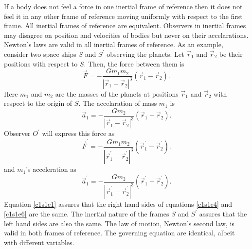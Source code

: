 If a body does not feel a force in one inertial frame of reference then it
does not feel it in any other frame of reference moving uniformly with respect
to the first frame. All inertial frames of reference are equivalent. Observers
in inertial frames may disagree on position and velocities of bodies but never
on their accelarations. Newton's laws are valid in all inertial frames of 
reference. As an example, consider two space ships $S$ and $S^\prime$ observing
the planets. Let $\vec{r}_1$ and $\vec{r}_2$ be their positions with respect
to $S$. Then, the force between them is
\begin{equation}\label{c1s1e4}
\vec{F} = -\frac{Gm_1m_2}{|\vec{r}_1 - \vec{r}_2|^3}(\vec{r}_1 - \vec{r}_2).
\end{equation}
Here $m_1$ and $m_2$ are the masses of the planets at positions $\vec{r}_1$
and $\vec{r}_2$ with respect to the origin of $S$. The accelaration of mass 
$m_1$ is
\begin{equation}\label{c1s1e5}
\vec{a}_1 = -\frac{Gm_2} {|\vec{r}_1 - \vec{r}_2|^3}(\vec{r}_1 - \vec{r}_2).
\end{equation}
Observer $O^\prime$ will express this force as
\begin{equation}\label{c1s1e6}
\vec{F}^\prime = 
-\frac{Gm_1m_2}{|\vec{r}_1^\prime - \vec{r}_2^\prime|^3}
(\vec{r}_1^\prime - \vec{r}_2^\prime).
\end{equation}
and $m_1$'s acceleration as 
\begin{equation}\label{c1s1e7}
\vec{a}_1^\prime = -\frac{Gm_2} {|\vec{r}_1^\prime - \vec{r}_2^\prime|^3}
(\vec{r}_1^\prime - \vec{r}_2^\prime).
\end{equation}
Equation \eqref{c1s1e1} assures that the right hand sides of equations 
\eqref{c1s1e4} and \eqref{c1s1e6} are the same. The inertial nature of the
frames $S$ and $S^\prime$ assures that the left hand sides are also the same.
The law of motion, Newton's second law, is valid in both frames of reference.
The governing equation are identical, albeit with different variables.







